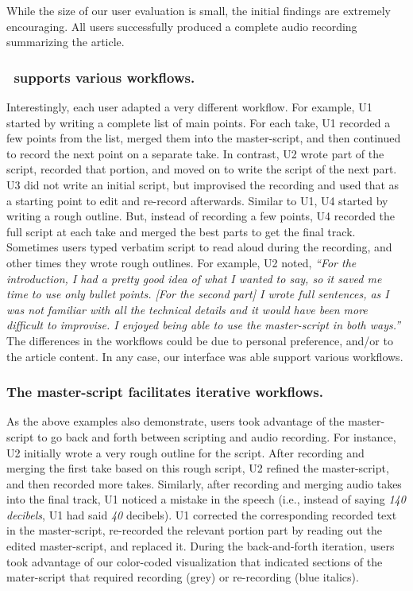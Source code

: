 While the size of our user evaluation is small, the initial findings are extremely encouraging. All users successfully produced a complete audio recording summarizing the article. %

\subsubsection{\voicescript\ supports various workflows.} 
Interestingly, each user adapted a very different workflow. For example, U1 started by writing a complete list of main points. For each take, U1 recorded a few points from the list, merged them into the master-script, and then continued to record the next point on a separate take. In contrast, U2 wrote part of the script, recorded that portion, and moved on to write the script of the next part. U3 did not write an initial script, but improvised the recording and used that as a starting point to edit and re-record afterwards. Similar to U1, U4 started by writing a rough outline. But, instead of recording a few points, U4 recorded the full script at each take and merged the best parts to get the final track.\\

Sometimes users typed verbatim script to read aloud during the recording, and other times they wrote rough outlines. For example, U2 noted,  \textit{``For
the introduction, I had a pretty good idea of what I wanted to
say, so it saved me time to use only bullet points. [For the
second part] I wrote full sentences, as I was not familiar with
all the technical details and it would have been more difficult
to improvise. I enjoyed being able to use the master-script in
both ways.''}\\ 

The differences in the workflows could be due to personal preference, and/or  to the article content. In any case, our interface was able support various workflows. 

\subsubsection{The master-script facilitates iterative workflows.} 
As the above examples also demonstrate, users took advantage of the master-script to go back and forth between scripting and audio recording. For instance, U2 initially wrote a very rough outline for the script.
After recording and merging the first take based on this rough script, U2 refined the master-script, and then recorded more takes. Similarly, after recording and merging audio takes into the final track, U1 noticed a mistake in the speech
(i.e., instead of saying \textit{140 decibels}, U1 had said \textit{40}
decibels). U1 corrected the corresponding recorded text in the
master-script, re-recorded
the relevant portion part by reading out the edited master-script, and replaced it.
During the back-and-forth iteration, users took advantage of our color-coded visualization that indicated sections of the mater-script that required recording  (grey) or re-recording (blue italics). 

